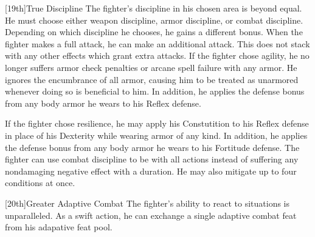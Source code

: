 [19th]{True Discipline}
The fighter's discipline in his chosen area is beyond equal.
He must choose either weapon discipline, armor discipline, or combat discipline.
Depending on which discipline he chooses, he gains a different bonus.
When the fighter makes a full attack, he can make an additional attack.
This does not stack with any other effects which grant extra attacks.
If the fighter chose agility, he no longer suffers armor check penalties or arcane spell failure with any armor.
He ignores the encumbrance of all armor, causing him to be treated as unarmored whenever doing so is beneficial to him.
In addition, he applies the defense bonus from any body armor he wears to his Reflex defense.

If the fighter chose resilience, he may apply his Constutition to his Reflex defense in place of his Dexterity while wearing armor of any kind.
In addition, he applies the defense bonus from any body armor he wears to his Fortitude defense.
The fighter can use combat discipline to be \impaired with all actions instead of suffering any nondamaging negative effect with a duration.
He may also mitigate up to four conditions at once.

[20th]{Greater Adaptive Combat}
The fighter's ability to react to situations is unparalleled.
As a swift action, he can exchange a single adaptive combat feat from his adapative feat pool.

